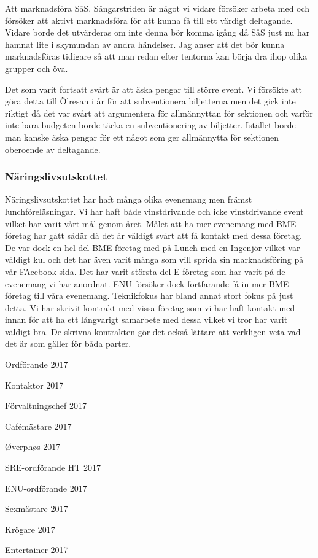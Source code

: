 \documentclass[../_main/handlingar.tex]{subfiles}
\begin{document}
Att marknadsföra SåS. Sångarstriden är något vi vidare försöker arbeta med och försöker att aktivt marknadsföra för att kunna få till ett värdigt deltagande. Vidare borde det utvärderas om inte denna bör komma igång då SåS just nu har hamnat lite i skymundan av andra händelser. Jag anser att det bör kunna marknadsföras tidigare så att man redan efter tentorna kan börja dra ihop olika grupper och öva. 

Det som varit fortsatt svårt är att äska pengar till större event. Vi försökte att göra detta till Ölresan i år för att subventionera biljetterna men det gick inte riktigt då det var svårt att argumentera för allmännyttan för sektionen och varför inte bara budgeten borde täcka en subventionering av biljetter. Istället borde man kanske äska pengar för ett något som ger allmännytta för sektionen oberoende av deltagande. 

\subsubsection*{Näringslivsutskottet}
Näringslivsutskottet har haft många olika evenemang men främst lunchföreläsningar. Vi har haft både vinstdrivande och icke vinstdrivande event vilket har varit vårt mål genom året. 
Målet att ha mer evenemang med BME-företag har gått sådär då det är väldigt svårt att få kontakt med dessa företag. De var dock en hel del BME-företag med på Lunch med en Ingenjör vilket var väldigt kul och det har även varit många som vill sprida sin marknadsföring på vår FAcebook-sida.
Det har varit största del E-företag som har varit på de evenemang vi har anordnat. ENU försöker dock fortfarande få in mer BME-företag till våra evenemang. Teknikfokus har bland annat stort fokus på just detta.
Vi har skrivit kontrakt med vissa företag som vi har haft kontakt med innan för att ha ett långvarigt samarbete med dessa vilket vi tror har varit väldigt bra. De skrivna kontrakten gör det också lättare att verkligen veta vad det är som gäller för båda parter. 

\newpage
\begin{signatures}{10}
    \mvh
    \signature{Erik Månsson}{Ordförande 2017}
    \signature{Johan Karlberg}{Kontaktor 2017}
    \signature{Sophia Grimmeiss Grahm}{Förvaltningschef 2017}
    \signature{Daniel Bakic}{Cafémästare 2017}
    \signature{Niklas Gustafson}{Øverphøs 2017}
    \signature{Edvard Carlsson}{SRE-ordförande HT 2017}
    \signature{Josefine Sandström}{ENU-ordförande 2017}
    \signature{Linnea Sjödahl}{Sexmästare 2017}
    \signature{Markus Rahne}{Krögare 2017}
    \signature{Albin Nyström Eklund}{Entertainer 2017}
\end{signatures}
\end{document}

